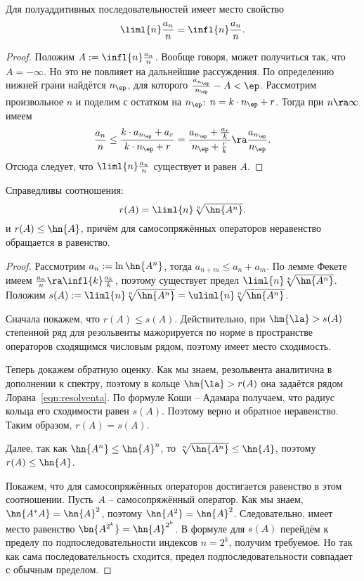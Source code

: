 \documentclass[a4paper]{article}
\begin{document}
\begin{lemma}[Фекете]
Для полуаддитивных последовательностей имеет место свойство
$$\liml{n} \frac{a_n}{n} = \infl{n}\frac{a_n}{n}.$$
\end{lemma}
\begin{proof}
Положим $A := \infl{n} \frac{a_n}{n}$. Вообще говоря, может получиться так, что $A = -\infty$.
Но это не повлияет на дальнейшие рассуждения. По определению нижней грани найдётся $n_\ep$,
для которого $\frac{a_{n_\ep}}{n_\ep}- A < \ep$. Рассмотрим произвольное $n$ и поделим с остатком на $n_\ep$:
$n = k\cdot n_\ep + r$. Тогда при $n \ra \infty$  имеем
$$\frac{a_n}{n} \le \frac{k\cdot a_{n_\ep} + a_r}{k\cdot n_\ep + r} = \frac{a_{n_\ep} + \frac{a_r}{k}}{n_\ep + \frac{r}{k}} \ra \frac{a_{n_\ep}}{n_\ep}.$$
Отсюда следует, что $\liml{n}\frac{a_n}{n}$ существует и равен $A$.
\end{proof}

\begin{lemma}
Справедливы соотношения:
$$r(A) = \liml{n} \sqrt[n]{\hn{A^n}}.$$
и $r(A) \le \hn{A}$, причём для самосопряжённых операторов неравенство обращается в равенство.
\end{lemma}
\begin{proof}
Рассмотрим $a_n := \ln \hn{A^n}$, тогда $a_{n+m} \le a_n + a_m$. По лемме Фекете
имеем $\frac{a_n}{n} \ra \infl{k} \frac{a_k}{k}$, поэтому существует предел
$\liml{n} \sqrt[n]{\hn{A^n}}$. Положим $s(A) := \liml{n}\sqrt[n]{\hn{A^n}} = \uliml{n}\sqrt[n]{\hn{A^n}}$.

Сначала покажем, что $r(A) \le s(A)$. Действительно, при $\hm{\la} > s(A)$ степенной ряд
для резольвенты
мажорируется по норме в пространстве операторов сходящимся числовым рядом, поэтому
имеет место сходимость.

Теперь докажем обратную оценку. Как мы знаем, резольвента аналитична в дополнении к спектру,
поэтому в кольце $\hm{\la} > r(A)$ она задаётся рядом Лорана~\eqref{eqn:resolventa}.
По формуле Коши -- Адамара  получаем, что радиус кольца его сходимости равен $s(A)$.
Поэтому верно и обратное неравенство. Таким образом, $r(A) = s(A)$.

Далее, так как $\hn{A^n} \le \hn{A}^n$, то $\sqrt[n]{\hn{A^n}} \le \hn{A}$, поэтому $r(A) \le \hn{A}$.

Покажем, что для самосопряжённых операторов достигается равенство в этом соотношении.
Пусть~$A$ -- самосопряжённый оператор. Как мы знаем, $\hn{A^*A} = \hn{A}^2$,
поэтому $\hn{A^2}=\hn{A}^2$. Следовательно, имеет место равенство $\bn{A^{2^k}} = \hn{A}^{2^k}$.
В формуле для $s(A)$ перейдём к пределу по подпоследовательности индексов $n = 2^k$, получим требуемое.
Но так как сама последовательность сходится, предел подпоследовательности совпадает с обычным пределом.
\end{proof}
\end{document}
